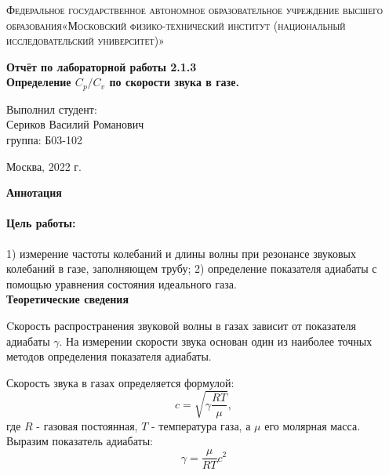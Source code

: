 \documentclass[a4paper, 12pt]{article}%
\begin{document}
	\begin{titlepage}
		\begin{center}
			\textsc{Федеральное государственное автономное образовательное учреждение высшего образования«Московский физико-технический институт (национальный исследовательский университет)»\\[5mm]
			}
			
			\vfill
			
			\textbf{Отчёт по лабораторной работы 2.1.3\\[3mm]
				Определение $C_p / C_v $ по скорости звука в газе.
				\\[50mm]
			}
			
		\end{center}
		
		\hfill
		\begin{minipage}{.5\textwidth}
			Выполнил студент:\\[2mm]
			Сериков Василий Романович\\[2mm]
			группа: Б03-102\\[5mm]
			
		\end{minipage}
		\vfill
		\begin{center}
			Москва, 2022 г.
		\end{center}
		
	\end{titlepage}
	
	\newpage
	
	\textbf{Аннотация}
	
	
	\paragraph{Цель работы:} 1) измерение частоты колебаний и длины волны при резонансе звуковых колебаний в газе, заполняющем трубу; 2) определение показателя адиабаты с помощью уравнения состояния идеального газа.
	\\
	
	\textbf{Теоретические сведения}
	
Cкорость распространения звуковой волны в газах зависит от показателя адиабаты $\gamma$. На измерении скорости звука основан один из наиболее  точных методов определения показателя  адиабаты.

Скорость звука в газах определяется формулой:
$$c=\sqrt{\gamma\frac{RT}{\mu}},$$
где $R$ - газовая постоянная, $T$ - температура газа, а $\mu$ его молярная масса. Выразим показатель адиабаты:
$$\gamma=\frac{\mu}{RT} c^2$$
\end{document}
